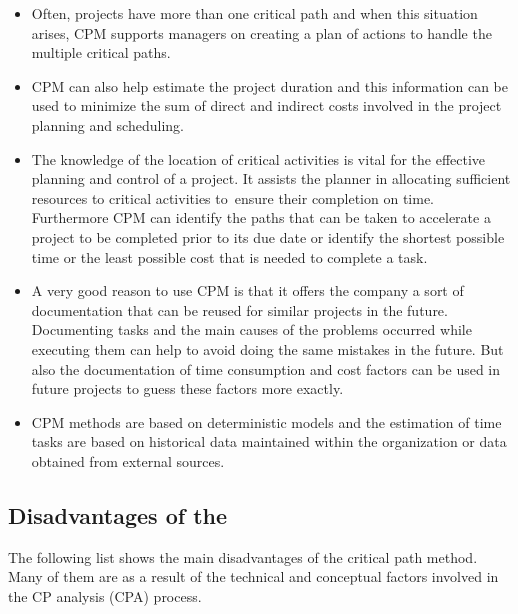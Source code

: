 \begin{itemize}
\item Often, projects have more than one critical path and when this situation arises, CPM supports
managers on creating a plan of actions to handle the multiple critical paths.

\item CPM can also help estimate the project duration and this information can be used to minimize the sum
of direct and indirect costs involved in the project planning and scheduling.

\item The knowledge of the location of critical activities is vital for the effective planning and control
of a project. It assists the planner in allocating sufficient resources to critical activities
to ensure their completion on time. Furthermore CPM can identify the paths that can be taken to
accelerate a project to be completed prior to its due date or identify the shortest possible time or
the least possible cost that is needed to complete a task.

\item A very good reason to use CPM is that it offers the company a sort of documentation that can be
reused for similar projects in the future. Documenting tasks and the main causes of the problems
occurred while executing them can help to avoid doing the same mistakes in the future. But also the
documentation of time consumption and cost factors can be used in future projects to guess these
factors more exactly.

\item CPM methods are based on deterministic models and the estimation of time tasks are based on
historical data maintained within the organization or data obtained from external sources.
\end{itemize}

\subsection{Disadvantages of the \cpm{}}

The following list shows the main disadvantages of the critical path method. Many of them are as a
result of the technical and conceptual factors involved in the CP analysis (CPA) process.

